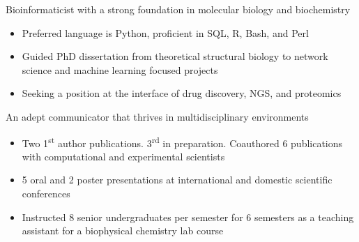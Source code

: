 

\begin{cventries}
\vspace{-4.0mm}

  \cventry
    {} %
    {} %
    {} %
    {} %
    {
      \begin{cvitems} %
      	\item {Bioinformaticist with a strong foundation in molecular biology and biochemistry}
      		\begin{itemize}
      			\item Preferred language is Python, proficient in SQL, R, Bash, and Perl
      			\item Guided PhD dissertation from theoretical structural biology to network science and machine learning focused projects
      			\item Seeking a position at the interface of drug discovery, NGS, and proteomics
      		\end{itemize}	
\vspace{1.0mm}
        \item {An adept communicator that thrives in multidisciplinary environments}
        	\begin{itemize}
         		\item Two 1\textsuperscript{st} author publications. 3\textsuperscript{rd} in preparation. Coauthored 6 publications with computational and experimental scientists
         		\item 5 oral and 2 poster presentations at international and domestic scientific conferences
         		\item Instructed 8 senior undergraduates per semester for 6 semesters as a teaching assistant for a biophysical chemistry lab course
        	\end{itemize}
      \end{cvitems}
    }
\vspace{-4.0mm}
\end{cventries}
